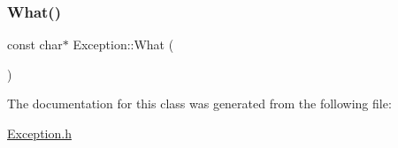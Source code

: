 \subsubsection{\texorpdfstring{What()}{What()}}
{\footnotesize\ttfamily const char$\ast$ Exception\+::\+What (\begin{DoxyParamCaption}{ }\end{DoxyParamCaption})}



The documentation for this class was generated from the following file\+:\begin{DoxyCompactItemize}
\item 
\mbox{\hyperlink{_exception_8h}{Exception.\+h}}\end{DoxyCompactItemize}

